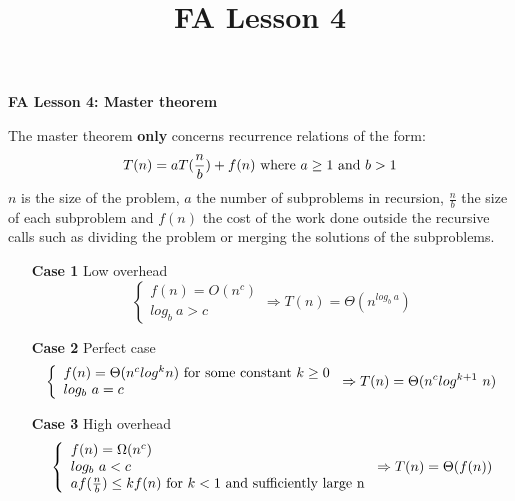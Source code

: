 \documentclass[11pt]{article}
\title{FA Lesson 4}
\begin{document}
\begin{center}
\textbf{FA Lesson 4: Master theorem}
\end{center}
The master theorem \textbf{only} concerns recurrence relations of the form:
\begin{equation}T(n)=aT(\frac{n}{b}) + f(n) \textnormal{ where } a \geq 1 \textnormal{ and } b > 1\end{equation}
\newline $n$ is the size of the problem, $a$ the number of subproblems in recursion, 
$\frac{n}{b}$ the size of each subproblem and $f(n)$ the cost of the work done outside the recursive calls
such as dividing the problem or merging the solutions of the subproblems.

\begin{itemize}
    \item [\textbf{Case 1}] Low overhead
    \begin{equation}
    \left\{
        \begin{array}{ll}
            f(n)=O(n^c) \\
            log_b\ a > c
        \end{array}
    \right. \Rightarrow T(n) = \Theta(n^{log_b\ a})
    \end{equation}
    \item [\textbf{Case 2}] Perfect case
    \begin{equation}
    \left\{
        \begin{array}{ll}
            f(n)=\Theta(n^{c}log^{k}n) \textnormal{ for some constant } k \geq 0 \\
            log_b\ a = c
        \end{array}
    \right. \Rightarrow T(n) = \Theta(n^{c}log^{k+1}\ n)
    \end{equation}
    \item [\textbf{Case 3}] High overhead
    \begin{equation}
    \left\{
        \begin{array}{ll}
            f(n)=\Omega(n^c) \\
            log_b\ a < c \\
            af(\frac{n}{b}) \leq kf(n) \textnormal{ for } k < 1 \textnormal{ and sufficiently large n}
        \end{array}
    \right. \Rightarrow T(n) = \Theta(f(n))
    \end{equation}
\end{itemize}
\end{document}
